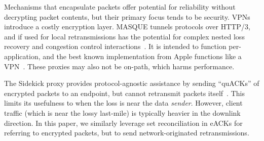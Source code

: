 Mechanisms that encapsulate packets
offer potential for reliability without decrypting packet contents, but their
primary focus tends to be security. VPNs introduce a costly
encryption layer.
MASQUE tunnels protocols over HTTP/3, and if used for local retransmissions
has the potential for complex nested loss recovery and congestion control
interactions~\cite{rfc9298masque,schinazi-masque-proxy-05,kramer2021masquepep}.
It is intended to function per-application, and the best known implementation
from Apple functions like a VPN~\cite{icloud-private-relay}.
These proxies may also not be on-path, which harms performance.





The Sidekick proxy provides protocol-agnostic assistance by sending
``quACKs'' of encrypted packets to an endpoint, but cannot retransmit
packets itself~\cite{yuan2024sidekick}. This limits its usefulness
to when the loss is near the data \textit{sender}.
However, client traffic (which is near the lossy last-mile) is typically heavier
in the downlink direction. In this paper, we similarly leverage set
reconciliation in eACKs for referring to encrypted packets,
but to send network-originated retransmissions.
